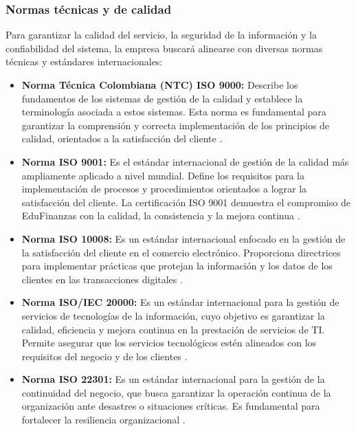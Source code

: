 \subsubsection*{Normas técnicas y de calidad}

Para garantizar la calidad del servicio, la seguridad de la información y la confiabilidad del sistema, la empresa buscará alinearse con diversas normas técnicas y estándares internacionales:

\begin{itemize}
	\item \textbf{Norma Técnica Colombiana (NTC) ISO 9000:} Describe los fundamentos de los sistemas de gestión de la calidad y establece la terminología asociada a estos sistemas. Esta norma es fundamental para garantizar la comprensión y correcta implementación de los principios de calidad, orientados a la satisfacción del cliente \parencite{ISO9000}.
	
	\item \textbf{Norma ISO 9001:} Es el estándar internacional de gestión de la calidad más ampliamente aplicado a nivel mundial. Define los requisitos para la implementación de procesos y procedimientos orientados a lograr la satisfacción del cliente. La certificación ISO 9001 demuestra el compromiso de EduFinanzas con la calidad, la consistencia y la mejora continua \parencite{ISO9001}.
	
	\item \textbf{Norma ISO 10008:} Es un estándar internacional enfocado en la gestión de la satisfacción del cliente en el comercio electrónico. Proporciona directrices para implementar prácticas que protejan la información y los datos de los clientes en las transacciones digitales \parencite{ISO10008}.
	
	\item \textbf{Norma ISO/IEC 20000:} Es un estándar internacional para la gestión de servicios de tecnologías de la información, cuyo objetivo es garantizar la calidad, eficiencia y mejora continua en la prestación de servicios de TI. Permite asegurar que los servicios tecnológicos estén alineados con los requisitos del negocio y de los clientes \parencite{ISO20000}.
	
	\item \textbf{Norma ISO 22301:} Es un estándar internacional para la gestión de la continuidad del negocio, que busca garantizar la operación continua de la organización ante desastres o situaciones críticas. Es fundamental para fortalecer la resiliencia organizacional \parencite{ISO22301}.
	

\end{itemize}
